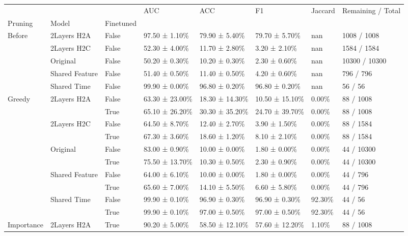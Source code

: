 \begin{tabular}{llllllll}
\toprule
 &  &  & AUC & ACC & F1 & Jaccard & Remaining / Total \\
Pruning & Model & Finetuned &  &  &  &  &  \\
\midrule
\multirow[t]{5}{*}{Before} & 2Layers H2A & False & 97.50 ± 1.10\% & 79.90 ± 5.40\% & 79.70 ± 5.70\% & nan & 1008 / 1008 \\
\cline{2-8}
 & 2Layers H2C & False & 52.30 ± 4.00\% & 11.70 ± 2.80\% & 3.20 ± 2.10\% & nan & 1584 / 1584 \\
\cline{2-8}
 & Original & False & 50.20 ± 0.30\% & 10.20 ± 0.30\% & 2.30 ± 0.60\% & nan & 10300 / 10300 \\
\cline{2-8}
 & Shared Feature & False & 51.40 ± 0.50\% & 11.40 ± 0.50\% & 4.20 ± 0.60\% & nan & 796 / 796 \\
\cline{2-8}
 & Shared Time & False & 99.90 ± 0.00\% & 96.80 ± 0.20\% & 96.80 ± 0.20\% & nan & 56 / 56 \\
\cline{1-8} \cline{2-8}
\multirow[t]{10}{*}{Greedy} & \multirow[t]{2}{*}{2Layers H2A} & False & 63.30 ± 23.00\% & 18.30 ± 14.30\% & 10.50 ± 15.10\% & 0.00\% & 88 / 1008 \\
 &  & True & 65.10 ± 26.20\% & 30.30 ± 35.20\% & 24.70 ± 39.70\% & 0.00\% & 88 / 1008 \\
\cline{2-8}
 & \multirow[t]{2}{*}{2Layers H2C} & False & 64.50 ± 8.70\% & 12.40 ± 2.70\% & 3.90 ± 1.50\% & 0.00\% & 88 / 1584 \\
 &  & True & 67.30 ± 3.60\% & 18.60 ± 1.20\% & 8.10 ± 2.10\% & 0.00\% & 88 / 1584 \\
\cline{2-8}
 & \multirow[t]{2}{*}{Original} & False & 83.00 ± 0.90\% & 10.00 ± 0.00\% & 1.80 ± 0.00\% & 0.00\% & 44 / 10300 \\
 &  & True & 75.50 ± 13.70\% & 10.30 ± 0.50\% & 2.30 ± 0.90\% & 0.00\% & 44 / 10300 \\
\cline{2-8}
 & \multirow[t]{2}{*}{Shared Feature} & False & 64.00 ± 6.10\% & 10.00 ± 0.00\% & 1.80 ± 0.00\% & 0.00\% & 44 / 796 \\
 &  & True & 65.60 ± 7.00\% & 14.10 ± 5.50\% & 6.60 ± 5.80\% & 0.00\% & 44 / 796 \\
\cline{2-8}
 & \multirow[t]{2}{*}{Shared Time} & False & 99.90 ± 0.10\% & 96.90 ± 0.30\% & 96.90 ± 0.30\% & 92.30\% & 44 / 56 \\
 &  & True & 99.90 ± 0.10\% & 97.00 ± 0.50\% & 97.00 ± 0.50\% & 92.30\% & 44 / 56 \\
\cline{1-8} \cline{2-8}
\multirow[t]{5}{*}{Importance} & 2Layers H2A & True & 90.20 ± 5.00\% & 58.50 ± 12.10\% & 57.60 ± 12.20\% & 1.10\% & 88 / 1008 \\

\end{tabular}
